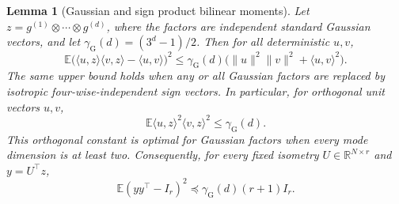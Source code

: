 \documentclass[11pt,a4paper]{article}
\newtheorem{lemma}[theorem]{Lemma}
\theoremstyle{definition}\newtheorem{definition}[theorem]{Definition}
\theoremstyle{remark}\newtheorem{remark}[theorem]{Remark}
\numberwithin{equation}{section}
\begin{document}
\begin{lemma}[Gaussian and sign product bilinear moments]
\label{sharp:lem:gaussian-bilinear}
Let $z=g^{(1)}\otimes\cdots\otimes g^{(d)}$, where the factors are
independent standard Gaussian vectors, and let
$\gamma_{\mathrm G}(d)=(3^d-1)/2$. Then for all deterministic $u,v$,
\[
 \mathbb E\bigl(\langle u,z\rangle\langle v,z\rangle
                   -\langle u,v\rangle\bigr)^2
 \le\gamma_{\mathrm G}(d)\bigl(\|u\|^2\|v\|^2+\langle u,v\rangle^2\bigr).
\]
The same upper bound holds when any or all Gaussian factors are replaced
by isotropic four-wise-independent sign vectors. In particular,
for orthogonal unit vectors $u,v$,
\[
 \mathbb E\langle u,z\rangle^2\langle v,z\rangle^2\le\gamma_{\mathrm G}(d).
\]
This orthogonal constant is optimal for Gaussian factors when every mode
dimension is at least two. Consequently, for every fixed isometry
$U\in\mathbb R^{N\times r}$ and $y=U^\top z$,
\begin{equation}\label{sharp:eq:gaussian-variance}
 \mathbb E(yy^\top-I_r)^2\preceq\gamma_{\mathrm G}(d)(r+1)I_r.
\end{equation}
\end{lemma}
\end{document}

